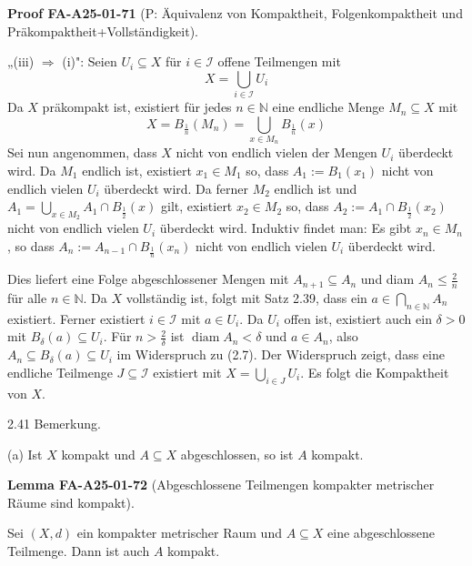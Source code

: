 \documentclass[10pt, letterpaper]{article}
\newcommand{\CustomHeading}[3]{%
  \par\medskip\noindent%
  \textbf{#1 #2} \textnormal{(#3)}.\enskip%
}
\newenvironment{LEM}[2]{\begin{unitbox}\CustomHeading{Lemma}{#1}{#2}}{\end{unitbox}}
\newenvironment{PROOF}[2]{\begin{unitbox}\CustomHeading{Proof}{#1}{#2}}{\end{unitbox}}
\begin{document}
\begin{PROOF}{FA-A25-01-71}{P: Äquivalenz von Kompaktheit, Folgenkompaktheit und Präkompaktheit+Vollständigkeit}
„(iii) $\Longrightarrow$ (i)": Seien $U_{i} \subseteq X$ für $i \in \mathcal{I}$ offene Teilmengen mit
$$
X=\bigcup_{i \in \mathcal{I}} U_{i}
$$
Da $X$ präkompakt ist, existiert für jedes $n \in \mathbb{N}$ eine endliche Menge $M_{n} \subseteq X$ mit
$$
X=B_{\frac{1}{n}}\left(M_{n}\right)=\bigcup_{x \in M_{n}} B_{\frac{1}{n}}(x)
$$
Sei nun angenommen, dass $X$ nicht von endlich vielen der Mengen $U_{i}$ überdeckt wird. Da $M_{1}$ endlich ist, existiert $x_{1} \in M_{1}$ so, dass $A_{1}:=B_{1}\left(x_{1}\right)$ nicht von endlich vielen $U_{i}$ überdeckt wird. Da ferner $M_{2}$ endlich ist und $A_{1}=\bigcup_{x \in M_{2}} A_{1} \cap B_{\frac{1}{2}}(x)$ gilt, existiert $x_{2} \in M_{2}$ so, dass $A_{2}:=A_{1} \cap B_{\frac{1}{2}}\left(x_{2}\right)$ nicht von endlich vielen $U_{i}$ überdeckt wird. Induktiv findet man: Es gibt $x_{n} \in M_{n}$, so dass $A_{n}:=A_{n-1} \cap B_{\frac{1}{n}}\left(x_{n}\right)$ nicht von endlich vielen $U_{i}$ überdeckt wird.

Dies liefert eine Folge abgeschlossener Mengen mit $A_{n+1} \subseteq A_{n}$ und diam $A_{n} \leq \frac{2}{n}$ für alle $n \in \mathbb{N}$. Da $X$ vollständig ist, folgt mit Satz 2.39, dass ein $a \in \bigcap_{n \in \mathbb{N}} A_{n}$ existiert. Ferner existiert $i \in \mathcal{I}$ mit $a \in U_{i}$. Da $U_{i}$ offen ist, existiert auch ein $\delta>0$ mit $B_{\delta}(a) \subseteq U_{i}$. Für $n>\frac{2}{\delta}$ ist $\operatorname{diam} A_{n}<\delta$ und $a \in A_{n}$, also $A_{n} \subseteq B_{\delta}(a) \subseteq U_{i}$ im Widerspruch zu (2.7). Der Widerspruch zeigt, dass eine endliche Teilmenge $J \subseteq \mathcal{I}$ existiert mit $X=\bigcup_{i \in J} U_{i}$. Es folgt die Kompaktheit von $X$.
\end{PROOF}


2.41 Bemerkung. 


(a) Ist $X$ kompakt und $A \subseteq X$ abgeschlossen, so ist $A$ kompakt.\\


\begin{LEM}{FA-A25-01-72}{Abgeschlossene Teilmengen kompakter metrischer Räume sind kompakt}
Sei $(X,d)$ ein kompakter metrischer Raum und $A \subseteq X$ eine abgeschlossene Teilmenge.  
Dann ist auch $A$ kompakt.
\end{LEM}
\end{document}
